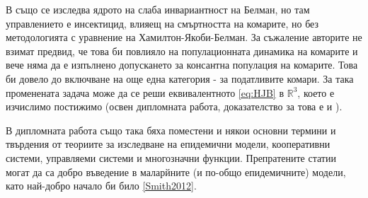 В \cite{DeLara2016} също се изследва ядрото на слаба инвариантност на Белман, но там управлението е инсектицид, влияещ на смъртността на комарите, но без методологията \cite{Zidani2013} с уравнение на Хамилтон-Якоби-Белман.
За съжаление авторите не взимат предвид, че това би повлияло на популационната динамика на комарите и вече няма да е изпълнено допускането за консантна популация на комарите.
Това би довело до включване на още една категория - за податливите комари.
За така променената задача може да се реши еквивалентното \eqref{eq:HJB} в $\mathbb{R}^3$, което е изчислимо постижимо (освен дипломната работа, доказателство за това е и \cite{Rashkov2021}).

В дипломната работа също така бяха поместени и някои основни термини и твърдения от теориите за изследване на епидемични модели, кооперативни системи, управляеми системи и многозначни функции.
Препратените статии могат да са добро въведение в маларйните (и по-общо епидемичните) модели, като най-добро начало би било \ref{Smith2012}.
